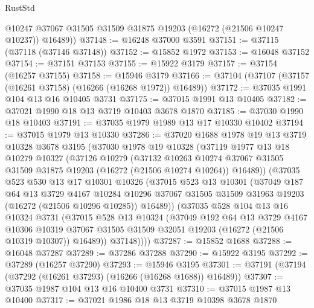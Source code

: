 \begin{lexlean}{RustStd}
\begin{coremodule}
        @10247
        @37067
        @31505
        @31509
        @31875
        @19203
        (@16272 (@21506 @10247 @10237))
        @16489))
@37148 := @16248 @37000 @3591
@37151 := @37115 (@37118 (@37146 @37148))
@37152 := @15852 @1972
@37153 := @16048 @37152
@37154 := @37151 @37153
@37155 := @15922 @3179
@37157 := @37154 (@16257 @37155)
@37158 := @15946 @3179
@37166 := @37104 (@37107 (@37157 (@16261 @37158) (@16266 (@16268 @1972)) @16489))
@37172 := @37035 @1991 @104 @13 @16 @10405 @3731
@37175 := @37015 @1991 @13 @10405
@37182 := @37021 @1990 @18 @13 @3719 @10403 @3678 @1870
@37185 := @37030 @1990 @18 @10403
@37191 := @37035 @1979 @1989 @13 @17 @10330 @10402
@37194 := @37015 @1979 @13 @10330
@37286 := @37020
    @1688
    @1978
    @19
    @13
    @3719
    @10328
    @3678
    @3195
    (@37030
      @1978
      @19
      @10328
      (@37119
        @1977
        @13
        @18
        @10279
        @10327
        (@37126
          @10279
          (@37132
            @10263
            @10274
            @37067
            @31505
            @31509
            @31875
            @19203
            (@16272 (@21506 @10274 @10264))
            @16489))
        (@37035
          @523
          @530
          @13
          @17
          @10301
          @10326
          (@37015
            @523
            @13
            @10301
            (@37049
              @187
              @64
              @13
              @3729
              @4167
              @10284
              @10296
              @37067
              @31505
              @31509
              @31963
              @19203
              (@16272 (@21506 @10296 @10285))
              @16489))
          (@37035
            @528
            @104
            @13
            @16
            @10324
            @3731
            (@37015
              @528
              @13
              @10324
              (@37049
                @192
                @64
                @13
                @3729
                @4167
                @10306
                @10319
                @37067
                @31505
                @31509
                @32051
                @19203
                (@16272 (@21506 @10319 @10307))
                @16489))
            @37148))))
@37287 := @15852 @1688
@37288 := @16048 @37287
@37289 := @37286 @37288
@37290 := @15922 @3195
@37292 := @37289 (@16257 @37290)
@37293 := @15946 @3195
@37301 := @37191 (@37194 (@37292 (@16261 @37293) (@16266 (@16268 @1688)) @16489))
@37307 := @37035 @1987 @104 @13 @16 @10400 @3731
@37310 := @37015 @1987 @13 @10400
@37317 := @37021 @1986 @18 @13 @3719 @10398 @3678 @1870

\end{coremodule}
\end{lexlean}
